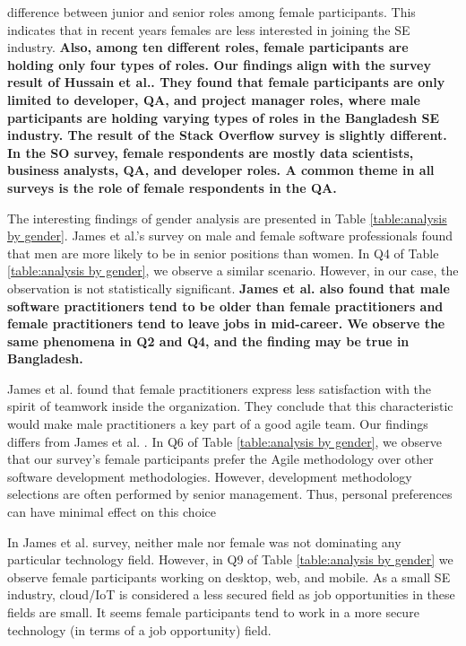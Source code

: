 difference between junior and senior roles among female participants. This
indicates that in recent years females are less interested in joining the SE
industry. \bf{Also, among ten different roles, female participants are holding only
four types of roles. Our findings align with the survey result of Hussain et
al.\citep{Hussain2020}. They found that female participants are only limited to
developer, QA, and project manager roles, where male participants are holding
varying types of roles in the Bangladesh SE industry. The result of the Stack
Overflow survey\citep{StackoverflowSurvey2020} is slightly different. In the SO
survey, female respondents are mostly data scientists, business analysts, QA,
and developer roles. A common theme in all surveys is the role of female
respondents in the QA.}



The interesting findings of gender analysis are presented in Table
\ref{table:analysis by gender}. James et al.'s \citep{James2017} survey on male
and female software professionals found that men are more likely to be in senior
positions than women. In Q4 of Table \ref{table:analysis by gender}, we observe
a similar scenario. However, in our case, the observation is not statistically
significant. \bf{James et al. \citep{James2017} also found that male software practitioners tend to be older
than female practitioners and female practitioners tend to leave jobs in
mid-career. We observe the same phenomena in Q2 and Q4, and the finding may be
true in Bangladesh.}


James et al.\citep{James2017} found that female practitioners express less
satisfaction with the spirit of teamwork inside the organization. They conclude
that this characteristic would make male practitioners a key part of a good
agile team. Our findings differs from James et al. \citep{James2017}. In Q6 of
Table \ref{table:analysis by gender}, we observe that our survey's female
participants prefer the Agile methodology over other software development
methodologies. However, development methodology selections are often performed
by senior management. Thus, personal preferences can have minimal effect on this
choice

In James et al. \citep{James2017} survey, neither male nor female was not dominating any
particular technology field. However, in Q9 of Table \ref{table:analysis by
gender} we observe female participants working on desktop, web, and mobile. As a
small SE industry, cloud/IoT is considered a less secured field as job
opportunities in these fields are small. It seems female participants tend to
work in a more secure technology (in terms of a job opportunity) field.